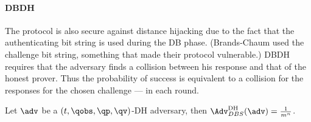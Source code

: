 \paragraph{\Acl{DBDH}}

The protocol is also secure against distance hijacking due to the fact that the 
authenticating bit string is used during the \ac{DB} phase.
(Brands-Chaum used the challenge bit string, something that made their protocol 
vulnerable.)
\Ac{DBDH} requires that the adversary finds a collision between his response 
and that of the honest prover.
Thus the probability of success is equivalent to a collision for the responses 
for the chosen challenge --- in each round.

\begin{theorem}
  Let \(\adv\) be a \((t, \qobs, \qp, \qv)\)-DH adversary, then 
  \(\Adv_{DBS}^{\text{DH}}(\adv) = \frac{1}{m^n}\).
\end{theorem}

